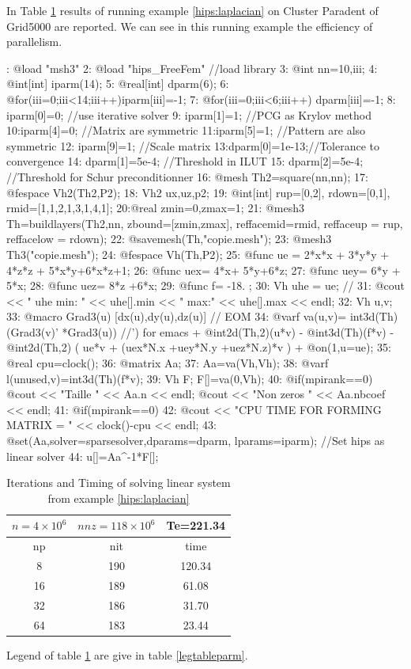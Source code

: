 \documentclass[a4paper,twoside,12pt]{book}
\begin{document}
In Table \ref{hipslabel} results of running example \ref{hips:laplacian} on
Cluster Paradent of Grid5000 are  reported. We can see in this running example
the efficiency of parallelism.
\begin{example}\label{hips:laplacian}
: @load "msh3"
2: @load "hips_FreeFem" //load library
3: @int nn=10,iii;
4: @int[int] iparm(14);
5: @real[int] dparm(6);
6: @for(iii=0;iii<14;iii++)iparm[iii]=-1;
7: @for(iii=0;iii<6;iii++) dparm[iii]=-1;
8: iparm[0]=0; //use iterative solver
9: iparm[1]=1; //PCG as Krylov method
10:iparm[4]=0; //Matrix are symmetric
11:iparm[5]=1; //Pattern are also symmetric
12: iparm[9]=1; //Scale matrix
13:dparm[0]=1e-13;//Tolerance to convergence
14: dparm[1]=5e-4; //Threshold in ILUT
15: dparm[2]=5e-4; //Threshold for Schur preconditionner
16: @mesh Th2=square(nn,nn);
17: @fespace Vh2(Th2,P2);
18: Vh2 ux,uz,p2;
19: @int[int] rup=[0,2],  rdown=[0,1], rmid=[1,1,2,1,3,1,4,1];
20:@real zmin=0,zmax=1;
21: @mesh3 Th=buildlayers(Th2,nn,
  zbound=[zmin,zmax],
  reffacemid=rmid,
  reffaceup = rup,
  reffacelow = rdown);
22: @savemesh(Th,"copie.mesh");
23: @mesh3 Th3("copie.mesh");
24: @fespace Vh(Th,P2);
25: @func ue =   2*x*x + 3*y*y + 4*z*z + 5*x*y+6*x*z+1;
26: @func uex=   4*x+  5*y+6*z;
27: @func uey=   6*y + 5*x;
28: @func uez=   8*z +6*x;
29: @func f= -18. ;
30: Vh uhe = ue; //
31: @cout << " uhe min:  " << uhe[].min << " max:" << uhe[].max << endl;
32: Vh u,v;
33: @macro Grad3(u) [dx(u),dy(u),dz(u)]  // EOM
34: @varf va(u,v)= int3d(Th)(Grad3(v)' *Grad3(u)) //') for emacs
         + @int2d(Th,2)(u*v)
         - @int3d(Th)(f*v)
         - @int2d(Th,2) ( ue*v + (uex*N.x +uey*N.y +uez*N.z)*v )
         + @on(1,u=ue);
35: @real cpu=clock();
36: @matrix Aa;
37: Aa=va(Vh,Vh);
38: @varf l(unused,v)=int3d(Th)(f*v);
39: Vh F; F[]=va(0,Vh);
40: @if(mpirank==0){
         @cout << "Taille " << Aa.n << endl;
         @cout << "Non zeros " << Aa.nbcoef << endl;
}
41:   @if(mpirank==0)
42:    @cout << "CPU TIME FOR FORMING MATRIX = " << clock()-cpu << endl;
43:    @set(Aa,solver=sparsesolver,dparams=dparm, lparams=iparm); //Set hips as linear solver
44:    u[]=Aa^-1*F[];
\eFF
\end{example}


\begin{table}
\begin{center}
\begin{tabular}{|c|c|c|}\hline
\textbf{$n=4 \times 10^6$} & \textbf{$nnz=118 \times 10^6$} & \textbf{Te=221.34}
\\ \hline
np & nit & time \\ \hline
8 & 190 & 120.34 \\ \hline
16 & 189 & 61.08 \\ \hline
32 & 186 &  31.70 \\ \hline
64 & 183 &  23.44 \\ \hline
\end{tabular}
\end{center}
\caption{Iterations and Timing of solving linear system from example
\ref{hips:laplacian}}
\label{hipslabel}
\end{table}
Legend of table \ref{hipslabel} are give in table \ref{legtableparm}.
\end{document}
